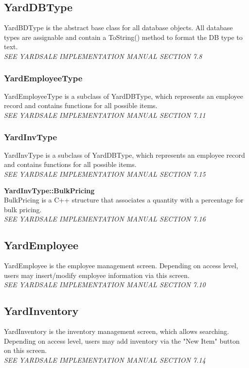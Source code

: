\documentclass{report}
\begin{document}
        \subsection{YardDBType}
        YardBDType is the abstract base class for all database
        objects.  All database types are assignable and contain a
        ToString() method to format the DB type to text.\\
        {\sl SEE YARDSALE IMPLEMENTATION MANUAL SECTION 7.8}

            \subsubsection{YardEmployeeType}
            YardEmployeeType is a subclass of YardDBType, which
            represents an employee record and contains functions for
            all possible items.\\
            {\sl SEE YARDSALE IMPLEMENTATION MANUAL SECTION 7.11}

            \subsubsection{YardInvType}
            YardInvType is a subclass of YardDBType, which
            represents an employee record and contains functions for
            all possible items.\\
            {\sl SEE YARDSALE IMPLEMENTATION MANUAL SECTION 7.15}
            \begin{list}{}
                \item {\bf YardInvType::BulkPricing}\\BulkPricing is a
                C++ structure that associates a quantity with a
                percentage for bulk pricing.\\
                {\sl SEE YARDSALE IMPLEMENTATION MANUAL SECTION 7.16}
            \end{list}

        \subsection{YardEmployee}
        YardEmployee is the employee management screen.  Depending on
        access level, users may insert/modify employee information via
        this screen.\\
        {\sl SEE YARDSALE IMPLEMENTATION MANUAL SECTION 7.10}

        \subsection{YardInventory}
        YardInventory is the inventory management screen, which allows
        searching.  Depending on access level, users may add inventory
        via the "New Item" button on this screen.\\
        {\sl SEE YARDSALE IMPLEMENTATION MANUAL SECTION 7.14}
\end{document}
